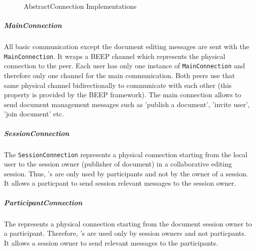 \begin{figure}[H]
 \centering
 \caption{AbstractConnection Implementations}
 \label{fig:network.discovery.connection.uml}
\end{figure}


\subparagraph{MainConnection}
All basic communication except the document editing messages are sent with the \texttt{MainConnection}. It wraps a BEEP channel which represents the physical connection to the peer. Each user has only one instance of \texttt{MainConnection} and therefore only one channel for the main communication. Both peers use that same physical channel bidirectionally to communicate with each other (this property is provided by the BEEP framework). The main connection allows to send document management messages such as 'publish a document', 'invite user', 'join document' etc.

\subparagraph{SessionConnection}
The \texttt{SessionConnection} represents a physical connection starting from the local user to the session owner (publisher of document) in a collaborative editing session. Thus, 's are only used by participants and not by the owner of a session. It allows a particpant to send session relevant messages to the session owner.

\subparagraph{ParticipantConnection}
The  represents a physical connection starting from the document session owner to a participant. Therefore, 's are used only by session owners and not particpants. It allows a session owner to send relevant messages to the participants. 



